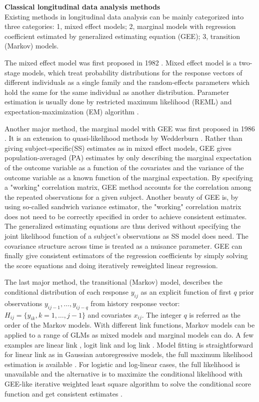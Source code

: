 \documentclass[12pt]{article}
\begin{document}
\textbf{Classical longitudinal data analysis methods}\\
Existing methods in longitudinal data analysis can be mainly categorized into three categories: 1, mixed effect models; 2, marginal models with regression coefficient estimated by generalized estimating equation (GEE); 3, transition (Markov) models. 

The mixed effect model was first proposed in 1982 \cite{laird1982random}. Mixed effect model is a two-stage models, which treat probability distributions for the response vectors of different individuals as a single family and the random-effects parameters which hold the same for the same individual as another distribution. Parameter estimation is usually done by restricted maximum likelihood (REML) and expectation-maximization (EM) algorithm \cite{laird1982random}. 

Another major method, the marginal model with GEE was first proposed in 1986 \cite{zeger1986longitudinal,liang1986longitudinal}. It is an extension to quasi-likelihood methods by Wedderburn \cite{wedderburn1974quasi}. Rather than giving subject-specific(SS) estimates as in mixed effect models, GEE gives population-averaged (PA) estimates by only describing the marginal expectation of the outcome variable as a function of the covariates and the variance of the outcome variable as a known function of the marginal expectation. By specifying a "working" correlation matrix, GEE method accounts for the correlation among the repeated observations for a given subject. Another beauty of GEE is, by using so-called sandwich variance estimator, the "working" correlation matrix does not need to be correctly specified in order to achieve consistent estimates. The generalized estimating equations are thus derived without specifying the joint likelihood function of a subject's observations as SS model does need. The covariance structure across time is treated as a nuisance parameter. GEE can finally give consistent estimators of the regression coefficients by simply solving the score equations and doing iteratively reweighted linear regression. 

The last major method, the transitional (Markov) model, describes the conditional distribution of each response $y_{ij}$ as an explicit function of first $q$ prior observations $y_{ij-1},\dots,y_{ij-q}$ from history response vector: $H_{ij} = \{ y_{ik}, k = 1,\dots,j - 1\}$ and covariates $x_{ij}$. The integer $q$ is referred as the order of the Markov models. With different link functions, Markov models can be applied to a range of GLMs as mixed models and marginal models can do. A few examples are linear link \cite{tsay1984regression}, logit link \cite{cox1989analysis,zeger1985analysis,korn1979methods} and log link \cite{zeger1988markov}. Model fitting is straightforward for linear link as in Gaussian autoregressive models, the full maximum likelihood estimation is available \cite{tsay1984regression}. For logistic and log-linear cases, the full likelihood is unavailable and the alternative is to maximize the conditional likelihood with GEE-like iterative weighted least square algorithm to solve the conditional score function and get consistent estimates \cite{cox1989analysis,zeger1985analysis,korn1979methods,zeger1988markov}.
\end{document}
